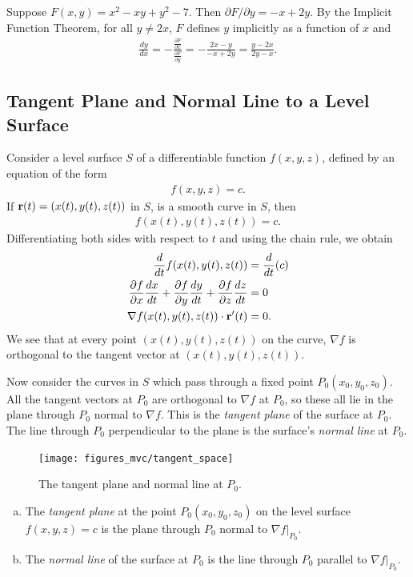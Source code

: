 \documentclass[12pt,letterpaper,reqno]{article}
\numberwithin{equation}{section}
\newcommand{\bbr}{{\bf r}}
\begin{document}
{\begin{example}
Suppose $F(x,y)=x^2-xy+y^2-7$. Then $\partial F/\partial y=-x+2y$. By the Implicit Function Theorem, for all $y \neq 2x$, $F$ defines $y$ implicitly as a function of $x$ and 
\begin{align*}
	\frac{dy}{dx}=-\frac{\frac{\partial F}{\partial x}}{\frac{\partial F}{\partial y}}=-\frac{2x-y}{-x+2y}=\frac{y-2x}{2y-x}.
\end{align*}
\end{example}

\subsection{Tangent Plane and Normal Line to a Level Surface}
Consider a level surface $S$ of a differentiable function $f(x,y,z)$, defined by an equation of the form
\begin{align*}
	f(x,y,z)=c.
\end{align*}
If $\bbr(t)=(x(t),y(t),z(t))$ in $S$, is a smooth curve in $S$, then
\begin{align*}
	f(x(t),y(t),z(t))=c.
\end{align*}
Differentiating both sides with respect to $t$ and using the chain rule, we obtain
\begin{align*}
	\frac{d}{dt}f(x(t),y(t),z(t))&=\frac{d}{dt}(c) \\
	\frac{\partial f}{\partial x}\frac{dx}{dt}+\frac{\partial f}{\partial y}\frac{dy}{dt}+\frac{\partial f}{\partial z}\frac{dz}{dt}&=0 \\
	\nabla f(x(t),y(t),z(t)) \cdot \bbr'(t)&=0.
\end{align*}
We see that at every point $(x(t),y(t),z(t))$ on the curve, $\nabla f$ is orthogonal to the tangent vector at $(x(t),y(t),z(t))$.

Now consider the curves in $S$ which pass through a fixed point $P_0(x_0,y_0,z_0)$. All the tangent vectors at $P_0$ are orthogonal to $\nabla f$ at $P_0$, so these all lie in the plane through $P_0$ normal to $\nabla f$. This is the \emph{tangent plane} of the surface at $P_0$. The line through $P_0$ perpendicular to the plane is the surface's \emph{normal line} at $P_0$.
\begin{figure}[h]
	\centering
	\texttt{[image: figures\_mvc/tangent\_space]}
	\caption{The tangent plane and normal line at $P_0$.}
\end{figure}

\begin{defn}\hspace{15cm}
	\begin{enumerate}[(a)]
		\item The \emph{tangent plane} at the point $P_0(x_0,y_0,z_0)$ on the level surface $f(x,y,z)=c$ is the plane through $P_0$ normal to $\nabla f|_{P_0}$. 
		\item The \emph{normal line} of the surface at $P_0$ is the line through $P_0$ parallel to $\nabla f|_{P_0}$.
	\end{enumerate}
\end{defn}

}
\end{document}
